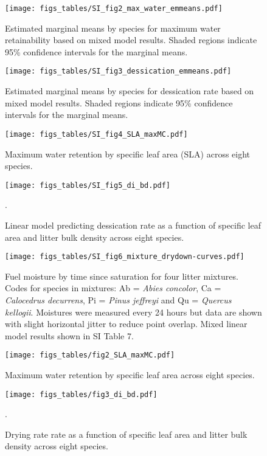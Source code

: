 \documentclass[letterpaper]{article}
\begin{document}
\begin{figure}[H]
  \centering
  \label{SI_fig2}
  \texttt{[image: figs\_tables/SI\_fig2\_max\_water\_emmeans.pdf]}
\caption{Estimated marginal means by species for maximum water retainability based on mixed model results. Shaded regions indicate 95\% confidence intervals for the marginal means.}
\end{figure}


\begin{figure}[H]
  \centering
  \label{SI_fig3}
\texttt{[image: figs\_tables/SI\_fig3\_dessication\_emmeans.pdf]}
\caption{Estimated marginal means by species for dessication rate based on mixed model results. Shaded regions indicate 95\% confidence intervals for the marginal means.}
\end{figure}

\begin{figure}[H]
  \centering
\texttt{[image: figs\_tables/SI\_fig4\_SLA\_maxMC.pdf]}
\caption{Maximum water retention by specific leaf area (SLA) across eight species.}
  \label{fig:maxmc-di}
\end{figure}


\begin{figure}[H]
  \centering
\texttt{[image: figs\_tables/SI\_fig5\_di\_bd.pdf]}
\caption{Linear model predicting dessication rate as a function of specific leaf area and litter bulk density across eight species.}.
  \label{fig:bd-di}
\end{figure}


\begin{figure}[H]
  \centering
\texttt{[image: figs\_tables/SI\_fig6\_mixture\_drydown-curves.pdf]}
\caption{Fuel moisture by time since saturation for four litter mixtures.  Codes for species in mixtures: Ab = \emph{Abies concolor}, Ca = \emph{Calocedrus decurrens}, Pi = \emph{Pinus jeffreyi} and Qu = \emph{Quercus kellogii}. Moistures were measured every 24 hours but data are shown with slight horizontal jitter to reduce point overlap. Mixed linear model results shown in SI Table 7.}
  \label{SI_fig6}
\end{figure}

\begin{figure}[H]
  \centering
\texttt{[image: figs\_tables/fig2\_SLA\_maxMC.pdf]}
\caption{Maximum water retention by specific leaf area across eight species.
}
  \label{fig:maxmc-di}
\end{figure}

\begin{figure}[H]
  \centering
\texttt{[image: figs\_tables/fig3\_di\_bd.pdf]}
\caption{Drying rate rate as a function of specific leaf area and litter bulk
  density across eight species.
}.
  \label{fig:bd-di}
\end{figure}
\end{document}
